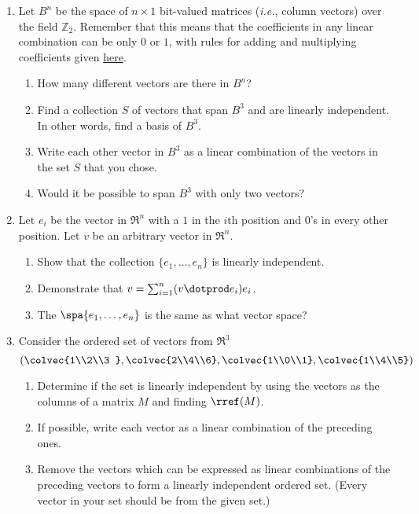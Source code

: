 


\begin{enumerate}
\item \label{bitsprob}Let $B^n$ be the space of $n\times 1$ bit-valued matrices ({\itshape i.e.}, column vectors) over the field \({\mathbb Z}_2\).
Remember that this means that the coefficients in any linear combination can be only \(0\) or \(1\), with rules for adding and multiplying coefficients given \hyperref[Z2]{here}.  
\begin{enumerate}
\item How many different vectors are there in $B^n$?
\item  Find a collection $S$ of vectors that span $B^3$ and are linearly independent.  In other words, find a basis of $B^3$.
\item Write each other vector in $B^3$ as a linear combination of the vectors in the set $S$ that you chose.
\item Would it be possible to span $B^3$ with only two vectors?
\end{enumerate}



\item \label{stdbasis} Let $e_i$ be the vector in $\Re^n$ with a $1$ in the $i$th position and $0$'s in every other position.  Let $v$ be an arbitrary vector in $\Re^n$.
\begin{enumerate}
\item Show that the collection $\{e_1, \ldots, e_n \}$ is linearly independent.
\item Demonstrate that $v=\sum_{i=1}^n (v\dotprod e_i)e_i$.
\item The $\spa \{e_1, \ldots, e_n \}$ is the same as what vector space?
\end{enumerate}


\item Consider the ordered set of vectors from $\Re^3$
\[
\left( \colvec{1\\2\\3 } , \colvec{2\\4\\6}, \colvec{1\\0\\1} , \colvec{1\\4\\5} \right) 
\]
\begin{enumerate}
\item Determine if the set is linearly independent by using the vectors as the columns of a matrix $M$ and finding $\rref(M)$.
\item If possible, write each vector as a linear combination of the preceding ones.
\item Remove the vectors which can be expressed as linear combinations of the preceding vectors to form a linearly independent ordered set. (Every vector in your set should be from the given set.)
\end{enumerate}


\end{enumerate}
